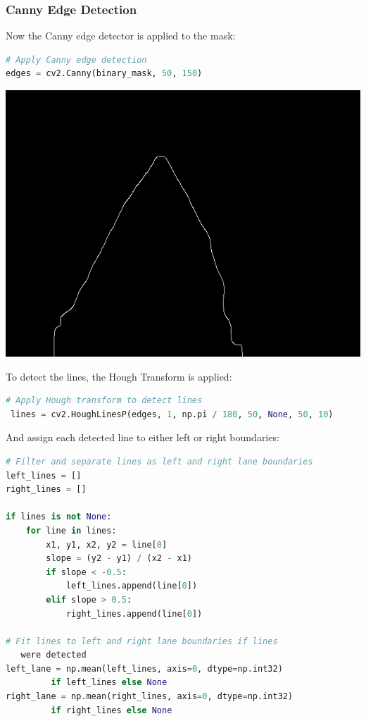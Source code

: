 \documentclass[12pt]{article}
\begin{document}
\subsubsection*{Canny Edge Detection}

Now the Canny edge detector is applied to the mask:
\begin{lstlisting}[language=Python]
# Apply Canny edge detection
edges = cv2.Canny(binary_mask, 50, 150)
\end{lstlisting}

\begin{center}
\includegraphics[width=1.0\textwidth]{Bilder/edges}
\end{center}

To detect the lines, the Hough Transform is applied:
\begin{lstlisting}[language=Python]
# Apply Hough transform to detect lines
 lines = cv2.HoughLinesP(edges, 1, np.pi / 180, 50, None, 50, 10)
\end{lstlisting}
And assign each detected line to either left or right boundaries:
\begin{lstlisting}[language=Python]
# Filter and separate lines as left and right lane boundaries
left_lines = []
right_lines = []

if lines is not None:
    for line in lines:
        x1, y1, x2, y2 = line[0]
        slope = (y2 - y1) / (x2 - x1)
        if slope < -0.5:
            left_lines.append(line[0])
        elif slope > 0.5:
            right_lines.append(line[0])

# Fit lines to left and right lane boundaries if lines 
   were detected
left_lane = np.mean(left_lines, axis=0, dtype=np.int32) 
	     if left_lines else None
right_lane = np.mean(right_lines, axis=0, dtype=np.int32) 
	     if right_lines else None
\end{lstlisting}
\end{document}
